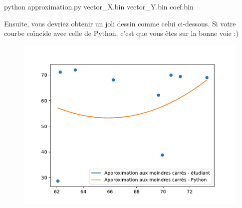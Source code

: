 \documentclass[a4paper, 12pt]{article}
\begin{document}
\begin{spverbatim}
    python approximation.py vector_X.bin vector_Y.bin coef.bin
\end{spverbatim}

\noindent Ensuite, vous devriez obtenir un joli dessin comme celui ci-dessous. Si votre courbe coïncide avec celle de Python, c'est que vous êtes sur la bonne voie :)

\begin{figure} [!htb]
    \begin{center}
        \includegraphics[width=\textwidth]{images/approximation.pdf}
    \end{center}
\end{figure}
\end{document}
